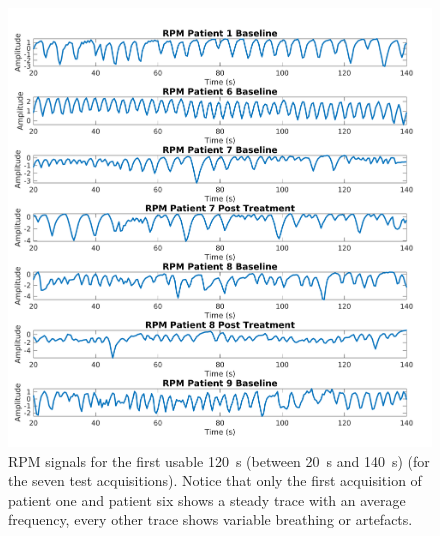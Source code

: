     \begin{figure}
        \centering
        
        \includegraphics[width=1.0\linewidth]{rpm_signals.png}
        
        \captionsetup{singlelinecheck=false}
        \caption{\gls{RPM} signals for the first usable \SI{120}{\second} (between \SI{20}{\second} and \SI{140}{\second}) (for the seven test acquisitions). Notice that only the first acquisition of patient one and patient six shows a steady trace with an average frequency, every other trace shows variable breathing or artefacts.}
        \label{fig:rpm_signals}
    \end{figure}

